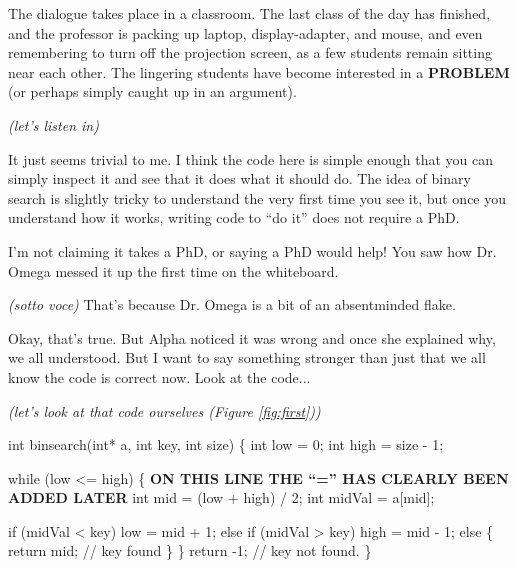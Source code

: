 \documentclass[sigplan]{acmart}
\begin{document}
The dialogue takes place in a classroom.  The last class of the day
has finished, and the professor is packing up laptop, 
display-adapter, and mouse, and even remembering to turn off the projection screen, as a few students remain sitting near each other.  The lingering students have become interested in a {\bf PROBLEM} (or perhaps simply caught up in an argument).

\vspace{0.1in}

\emph{(let's listen in)}

\vspace{0.1in}

  It just seems trivial to me.  I think the code here is simple enough that you can simply inspect it and see that it does what it should do.  The idea of binary search is slightly tricky to understand the very first time you see it, but once you understand how it works, writing code to ``do it'' does not require a PhD.

\vspace{0.1in}

  I'm not claiming it takes a PhD, or saying a PhD would help!  You saw how Dr. Omega messed it up the first time on the whiteboard.

\vspace{0.1in}

 \emph{(sotto voce)} That's because
Dr. Omega is a bit of an absentminded flake.

\vspace{0.1in}

  Okay, that's true.  But Alpha noticed it
was wrong and once she explained why, we all understood.  But I want
to say something stronger than just that we all know the code is
correct now.  Look at the code...

\vspace{0.1in}

\emph{(let's look at that code ourselves (Figure \ref{fig:first}))}

\vspace{0.1in}

\begin{figure*}
  {\scriptsize
  \begin{code}
int binsearch(int* a, int key, int size) \{
  int low = 0;
  int high = size - 1;
  
  while (low <= high) \{ {\bf ON THIS LINE THE ``='' HAS CLEARLY BEEN ADDED LATER}
    int mid = (low + high) / 2;
    int midVal = a[mid];

    if (midVal < key)
      low = mid + 1;
    else if (midVal > key)
      high = mid - 1;
    else \{
      return mid; // key found
    \}
  \}
  return -1;  // key not found.
\}
\end{code}
}
\caption{C Code on the Whiteboard at the End of Class}
\label{fig:first}
\end{figure*}
\end{document}
